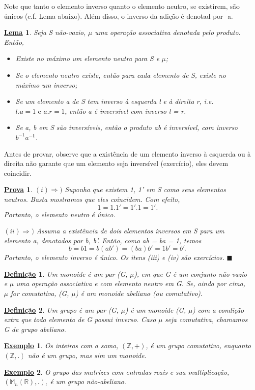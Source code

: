 \documentclass{article}
\newtheorem*{def*}{\underline{Defini\c c\~ao}}
\newtheorem{example*}{\underline{Exemplo}}
\newtheorem*{proof*}{\underline{Prova}}
\newtheorem*{lemma*}{\underline{Lema}}
\renewcommand\qedsymbol{$\blacksquare$}
\begin{document}
  Note que tanto o elemento inverso quanto o elemento neutro, se existirem, s\~ao \'unicos (c.f. Lema abaixo). Al\'em disso, o inverso da adi\c c\~ao \'e
denotad por -a.
\begin{lemma*}
  Seja S n\~ao-vazio, $\mu$ uma opera\c c\~ao associativa denotada pelo produto. Ent\~ao, 
 \begin{itemize}
   \item[i)] Existe no m\'aximo um elemento neutro para S e $\mu$;
   \item[ii)] Se o elemento neutro existe, ent\~ao para cada elemento de S, existe no m\'aximo um inverso;
   \item[iii)] Se um elemento a de S tem inverso \`a esquerda l e \`a direita r, i.e. $l.a = 1 \text{ e } a.r = 1$, ent\~ao
a \'e invers\'ivel com inverso l = r.
   \item[iv)] Se a, b em S s\~ao invers\'iveis, ent\~ao o produto ab \'e invers\'ivel, com inverso $b^{-1}a^{-1}.$
 \end{itemize}
\end{lemma*}
  Antes de provar, observe que a exist\^encia de um elemento inverso \`a esquerda ou \`a direita n\~ao garante que um elemento
seja invers\'ivel (exerc\'icio), eles devem coincidir.
\begin{proof*}
 $(i)\Rightarrow)$ Suponha que existem 1, 1' em S como seus elementos neutros. Basta mostramos que eles coincidem. Com efeito,
 $$
    1 = 1.1' = 1'.1 = 1'.
 $$
 Portanto, o elemento neutro \'e \'unico.

 $(ii)\Rightarrow)$ Assuma a exist\^encia de dois elementos inversos em S para um elemento a, denotados por b, b'. Ent\~ao, como
ab = ba = 1, temos
  $$
    b = b1 = b(ab') = (ba)b' = 1b' = b'.
  $$
  Portanto, o elemento inverso \'e \'unico. Os itens (iii) e (iv) s\~ao exerc\'icios. \qedsymbol
\end{proof*}
  
 \begin{def*}
   Um monoide \'e um par (G, $\mu$), em que G \'e um conjunto n\~ao-vazio e $\mu$ uma opera\c c\~ao associativa e com elemento neutro em G.
  Se, ainda por cima, $\mu$ for comutativa, (G, $\mu$) \' e um monoide abeliano (ou comutativo).
 \end{def*}
 \begin{def*}
   Um grupo \'e um par (G, $\mu$) \'e um monoide (G, $\mu$) com a condi\c c\~ao extra que todo elemento de G possui inverso. Caso
 $\mu$ seja comutativa, chamamos G de grupo abeliano.
 \end{def*}
\begin{example*}
  Os inteiros com a soma, $(\mathbb{Z}, +)$, \'e um grupo comutativo, enquanto $(\mathbb{Z}, .)$ n\~ao \'e um grupo, mas sim um monoide.
\end{example*}
\begin{example*}
  O grupo das matrizes com entradas reais e sua multiplica\c c\~ao, $(\mathbb{M}_{n}(\mathbb{R}), .)$, \'e um grupo n\~ao-abeliano.
\end{example*}
\end{document}

